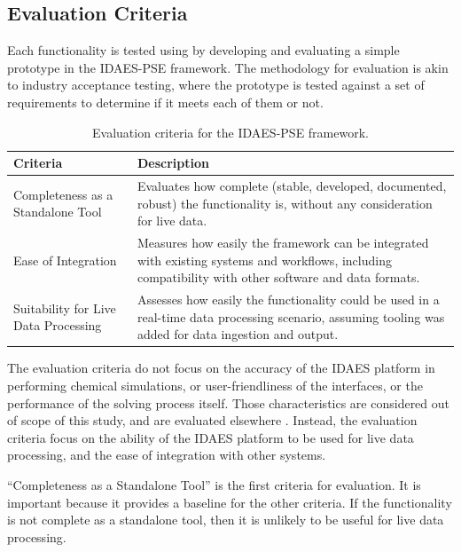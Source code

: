 \documentclass[12pt]{article}
\begin{document}
\subsection{Evaluation Criteria}

Each functionality is tested using by developing and evaluating a simple prototype in the IDAES-PSE framework. The methodology for evaluation is akin to industry acceptance testing, where the prototype is tested against a set of requirements to determine if it meets each of them or not. 


\begin{table}[h]
    \centering
    \begin{tabular}{|l|p{10cm}|}
        \hline
        \textbf{Criteria} & \textbf{Description} \\
        \hline
        Completeness as a Standalone Tool & Evaluates how complete (stable, developed, documented, robust) the functionality is, without any consideration for live data. \\
        \hline
        Ease of Integration & Measures how easily the framework can be integrated with existing systems and workflows, including compatibility with other software and data formats. \\
        \hline
        Suitability for Live Data Processing & Assesses how easily the functionality could be used in a real-time data processing scenario, assuming tooling was added for data ingestion and output. \\
        \hline
    \end{tabular}
    \caption{Evaluation criteria for the IDAES-PSE framework.}
    \label{tab:evaluation_criteria}
\end{table}


The evaluation criteria do not focus on the accuracy of the IDAES platform in performing chemical simulations, or user-friendliness of the interfaces, or the performance of the solving process itself. Those characteristics are considered out of scope of this study, and are evaluated elsewhere \cite{hart2011pyomo} \cite{myhre2022investigation}. Instead, the evaluation criteria focus on the ability of the IDAES platform to be used for live data processing, and the ease of integration with other systems.

``Completeness as a Standalone Tool'' is the first criteria for evaluation. It is important because it provides a baseline for the other criteria. If the functionality is not complete as a standalone tool, then it is unlikely to be useful for live data processing. 
\end{document}
